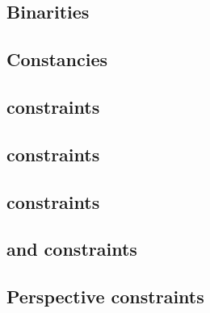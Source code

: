 \subsection{Binarities                                                                                }  \label{rlp auth: generalities: binarities}                                  %
\subsection{Constancies                                                                               }  \label{rlp auth: generalities: constancies}                                 %
\subsection{\iomf{} constraints                                                                       }  \label{rlp auth: generalities: iomf}                                        %
\subsection{\userTransactionNumber{}           constraints                                            }  \label{rlp auth: generalities: user transaction number}                     %
\subsection{\rlpAuthMacroAuthorityTupleIndex{} constraints                                            }  \label{rlp auth: generalities: authority tuple index}                       %
\subsection{\transactionTypeWithAuthorityLists{} and \transactionTypeWithAuthorityLists{} constraints }  \label{rlp auth: generalities: transactions with or sans authority list}    %
\subsection{Perspective constraints                                                                   }  \label{rlp auth: generalities: perspectives}                                %
